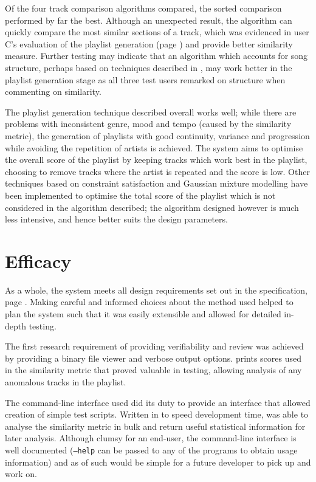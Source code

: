 Of the four track comparison algorithms compared, the sorted comparison performed by far the best. Although an unexpected result, the algorithm can quickly compare the most similar sections of a track, which was evidenced in user C's evaluation of the playlist generation (page \pageref{text:testing:user:blind:c}) and provide better similarity measure. Further testing may indicate that an algorithm which accounts for song structure, perhaps based on techniques described in \citet{Bruderer2006}, may work better in the playlist generation stage as all three test users remarked on structure when commenting on similarity.

The playlist generation technique described overall works well; while there are problems with inconsistent genre, mood and tempo (caused by the similarity metric), the generation of playlists with good continuity, variance and progression while avoiding the repetition of artists is achieved. The system aims to optimise the overall score of the playlist by keeping tracks which work best in the playlist, choosing to remove tracks where the artist is repeated and the score is low. Other techniques based on constraint satisfaction \citep{Vossen2005} and Gaussian mixture modelling \citep{Aucouturier2003} have been implemented to optimise the total score of the playlist which is not considered in the algorithm described; the algorithm designed however is much less intensive, and hence better suits the design parameters.
\section{Efficacy}
As a whole, the system meets all design requirements set out in the specification, page \pageref{text:spec}. Making careful and informed choices about the method used helped to plan the system such that it was easily extensible and allowed for detailed in-depth testing.

The first research requirement of providing verifiability and review was achieved by providing a binary file viewer and verbose output options.  prints scores used in the similarity metric that proved valuable in testing, allowing analysis of any anomalous tracks in the playlist.

The command-line interface used did its duty to provide an interface that allowed creation of simple test scripts. Written in  to speed development time,  was able to analyse the similarity metric in bulk and return useful statistical information for later analysis. Although clumsy for an end-user, the command-line interface is well documented (\texttt{--help} can be passed to any of the programs to obtain usage information) and as of such would be simple for a future developer to pick up and work on.

